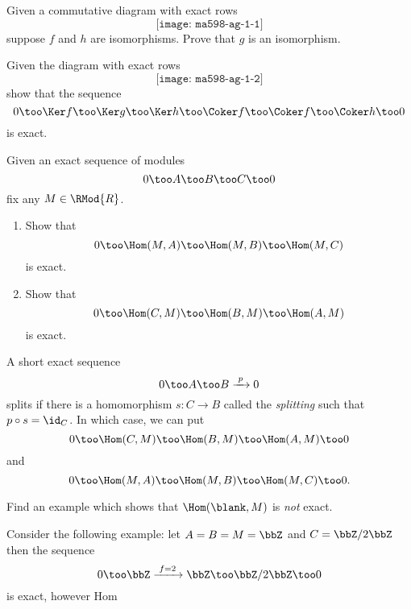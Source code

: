 \begin{problem}[\(5\)-lemma]
  Given a commutative diagram with exact rows
  \[
    \texttt{[image: ma598-ag-1-1]}
  \]
  suppose \(f\) and \(h\) are isomorphisms. Prove that \(g\) is an
  isomorphism.
\end{problem}
\begin{solution}

\end{solution}
\newpage

\begin{problem}
  Given the diagram with exact rows
  \[
    \texttt{[image: ma598-ag-1-2]}
  \]
  show that the sequence
  \[
    0\too
    \Ker f\too
    \Ker g\too
    \Ker h\too
    \Coker f\too
    \Coker f\too
    \Coker h\too
    0
  \]
  is exact.
\end{problem}
\begin{solution}
\end{solution}
\newpage

\begin{problem}
  Given an exact sequence of modules
  \[
    0\too A\too B\too C\too 0
  \]
  fix any \(M\in\RMod{R}\).
  \begin{enumerate}[label=(\alph*)]
  \item Show that
    \[
      0\too \Hom(M,A)\too\Hom(M,B)\too\Hom(M,C)
    \]
    is exact.
  \item Show that
    \[
      0\too \Hom(C,M)\too\Hom(B,M)\too\Hom(A,M)
    \]
    is exact.
  \end{enumerate}
\end{problem}
\begin{solution}
\end{solution}
\newpage

\begin{problem}
  A short exact sequence
  \[
    0\too A\too B\xrightarrow{\,\,p\,\,} 0
  \]
  splits if there is a homomorphism \(s\colon C\to B\) called the
  \emph{splitting} such that \(p\circ s=\id_C\). In which case, we can put
  \[
    0\too\Hom(C,M)\too\Hom(B,M)\too\Hom(A,M)\too 0
  \]
  and
  \[
    0\too\Hom(M,A)\too\Hom(M,B)\too\Hom(M,C)\too 0.
  \]
\end{problem}
\begin{solution}
\end{solution}
\newpage

\begin{problem}
  Find an example which shows that \(\Hom(\blank,M)\) is \emph{not} exact.
\end{problem}
\begin{solution}
  Consider the following example: let \(A=B=M=\bbZ\) and \(C=\bbZ/2\bbZ\)
  then the sequence
  \[
    0\too\bbZ\xrightarrow{\,\,f=2\,\,}\bbZ\too\bbZ/2\bbZ\too 0
  \]
  is exact, however Hom
\end{solution}

